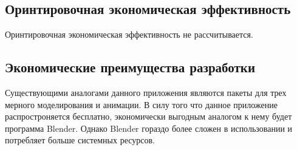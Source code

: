 \subsection{Оринтировочная экономическая эффективность}
Оринтировочная экономическая эффективность не рассчитывается.

\subsection{Экономические преимущества разработки}
Существующими аналогами данного приложения являются пакеты для трех мерного моделирования и анимации. В силу того что данное приложение распростроняется бесплатно, экономически выгодным аналогом к нему будет программа Blender. Однако Blender гораздо более сложен в использовании и потребляет больше системных ресурсов.
